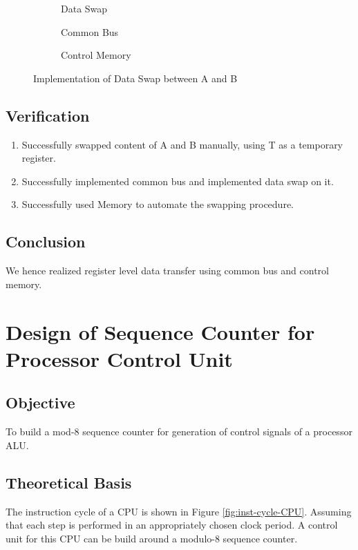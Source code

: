 \documentclass[a4paper]{article}
\begin{document}
\begin{figure}[h!]
    \centering
    \begin{subfigure}[b]{0.45\linewidth}
        \centering
        \caption{Data Swap}
    \end{subfigure}
    \begin{subfigure}[b]{0.45\linewidth}
        \centering
        \caption{Common Bus}
    \end{subfigure}
    \begin{subfigure}[b]{\linewidth}
        \centering
        \caption{Control Memory}
    \end{subfigure}
    \caption{Implementation of Data Swap between A and B}
    \label{Fig:imp-d-swap}
\end{figure}

\subsection{Verification}   
\begin{enumerate}
    \item Successfully swapped content of A and B manually, using T as a temporary register.
    \item Successfully implemented common bus and implemented data swap on it.
    \item Successfully used Memory to automate the swapping procedure.
\end{enumerate}   

\subsection{Conclusion}
We hence realized register level data transfer using common bus and control memory.
\pagebreak

\section{Design of Sequence Counter for Processor Control Unit}
\subsection{Objective}
To build a mod-8 sequence counter for generation of control signals of a processor ALU.

\subsection{Theoretical Basis}
The instruction cycle of a CPU is shown in Figure \ref{fig:inst-cycle-CPU}. Assuming that each step is performed in an appropriately chosen clock period. A control unit for this CPU can be build around a modulo-8 sequence counter.
\end{document}
